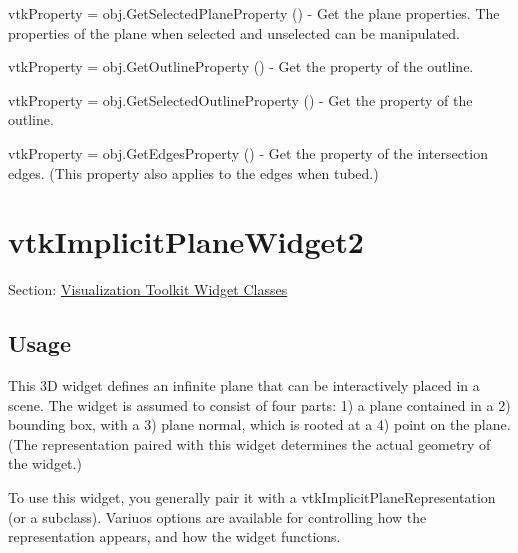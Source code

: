 \begin{DoxyItemize}
\item {\ttfamily vtk\-Property = obj.\-Get\-Selected\-Plane\-Property ()} -\/ Get the plane properties. The properties of the plane when selected and unselected can be manipulated.  
\item {\ttfamily vtk\-Property = obj.\-Get\-Outline\-Property ()} -\/ Get the property of the outline.  
\item {\ttfamily vtk\-Property = obj.\-Get\-Selected\-Outline\-Property ()} -\/ Get the property of the outline.  
\item {\ttfamily vtk\-Property = obj.\-Get\-Edges\-Property ()} -\/ Get the property of the intersection edges. (This property also applies to the edges when tubed.)  
\end{DoxyItemize}\hypertarget{vtkwidgets_vtkimplicitplanewidget2}{}\section{vtk\-Implicit\-Plane\-Widget2}\label{vtkwidgets_vtkimplicitplanewidget2}
Section\-: \hyperlink{sec_vtkwidgets}{Visualization Toolkit Widget Classes} \hypertarget{vtkwidgets_vtkxyplotwidget_Usage}{}\subsection{Usage}\label{vtkwidgets_vtkxyplotwidget_Usage}
This 3\-D widget defines an infinite plane that can be interactively placed in a scene. The widget is assumed to consist of four parts\-: 1) a plane contained in a 2) bounding box, with a 3) plane normal, which is rooted at a 4) point on the plane. (The representation paired with this widget determines the actual geometry of the widget.)

To use this widget, you generally pair it with a vtk\-Implicit\-Plane\-Representation (or a subclass). Variuos options are available for controlling how the representation appears, and how the widget functions.

